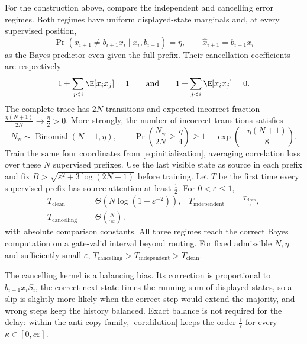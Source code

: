 \begin{mainresult}\begin{theorem}
\label{thm:causal}
For the construction above, compare the independent and cancelling error regimes.
Both regimes have uniform displayed-state marginals and, at every supervised position,
\[
 \Pr(x_{i+1}\ne b_{i+1}x_i\mid x_i,b_{i+1})=\eta,
 \qquad \hat x_{i+1}=b_{i+1}x_i
\]
as the Bayes predictor even given the full prefix.
Their cancellation coefficients are respectively
\[
 1+\sum_{j<i}\E[x_i x_j]=1\qquad\text{and}\qquad
 1+\sum_{j<i}\E[x_i x_j]=0.
\]
The complete trace has $2N$ transitions and expected incorrect fraction
$\tfrac{\eta(N+1)}{2N}\to\tfrac{\eta}{2}>0$.
More strongly, the number of incorrect transitions satisfies
\[
 N_{\mathrm w}\sim\operatorname{Binomial}(N+1,\eta),\qquad
 \Pr\!\left(\frac{N_{\mathrm w}}{2N}\ge\frac{\eta}{4}\right)
 \ge1-\exp\!\left(-\frac{\eta(N+1)}{8}\right).
\]
Train the same four coordinates from \cref{eq:initialization}, averaging correlation loss over these $N$ supervised prefixes.
Use the last visible state as source in each prefix and fix $B>\sqrt{\varepsilon^2+3\log(2N-1)}$ before training.
Let $T$ be the first time every supervised prefix has source attention at least $\tfrac{1}{2}$.
For $0<\varepsilon\le1$,
\begin{align*}
 T_{\mathrm{clean}}&=\Theta(N\log(1+\varepsilon^{-2})),&
 T_{\mathrm{independent}}&=\frac{T_{\mathrm{clean}}}{\gamma},\\
 T_{\mathrm{cancelling}}&=\Theta\!\left(\frac{N}{\gamma\varepsilon}\right).
\end{align*}
with absolute comparison constants. All three regimes reach the correct Bayes computation on a gate-valid interval beyond routing.
For fixed admissible $N,\eta$ and sufficiently small $\varepsilon$, $T_{\mathrm{cancelling}}>T_{\mathrm{independent}}>T_{\mathrm{clean}}$.
\end{theorem}\end{mainresult}
The cancelling kernel is a balancing bias. Its correction is proportional to $b_{i+1}x_i S_i$, the correct next state times the running sum of
displayed states, so a slip is slightly more likely when the correct step would extend the majority, and wrong steps keep the history balanced.
Exact balance is not required for the delay: within the anti-copy family, \cref{cor:dilution} keeps the order $\tfrac{1}{\varepsilon}$ for every
$\kappa\in[0,c\varepsilon]$.
\Needspace{0.35\textheight}
